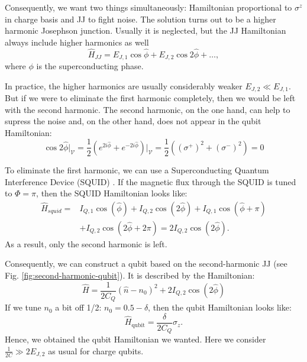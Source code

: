 \documentclass[reprint, aps, prx, amsmath, amssymb, longbibliography, superscriptaddress]{revtex4-2}
\begin{document}
Consequently, we want two things simultaneously: Hamiltonian proportional to $\sigma^z$ in charge basis and JJ to fight noise. The solution turns out to be a higher harmonic Josephson junction. Usually it is neglected, but the JJ Hamiltonian always include higher harmonics as well
\begin{equation}
    \hat H_{JJ} = E_{J,1} \cos{\hat \phi} + E_{J,2} \cos{2\hat \phi} + \dots,
\end{equation}
where $\phi$ is the superconducting phase.

In practice, the higher harmonics are usually considerably weaker $E_{J,2} \ll E_{J,1}$. But if we were to eliminate the first harmonic completely, then we would be left with the second harmonic. The second harmonic, on the one hand, can help to supress the noise and, on the other hand, does not appear in the qubit Hamiltonian:
\begin{equation}
    \cos{2\hat \phi}\bigg|_{\mathcal{V}} = \frac{1}{2}\left(e^{2i\hat\phi} + e^{-2i\hat \phi}\right)\bigg|_{\mathcal{V}}=\frac{1}{2}\left((\sigma^+)^2 + (\sigma^-)^2\right) =0
\end{equation}

To eliminate the first harmonic, we can use a Superconducting Quantum Interference Device (SQUID) \cite{valentini_parityconserving_2024}. If the magnetic flux through the SQUID is tuned to $\Phi = \pi$, then the SQUID Hamiltonian looks like:
\begin{equation}
\begin{aligned}
    \hat H_{squid} = &I_{Q,1} \cos(\hat \phi) + I_{Q,2} \cos(2\hat \phi) + I_{Q,1} \cos(\hat \phi + \pi) \\
    &+ I_{Q,2} \cos(2\hat \phi + 2\pi) = 2 I_{Q,2} \cos(2\hat \phi).
\end{aligned}
\end{equation}
As a result, only the second harmonic is left.

Consequently, we can construct a qubit based on the second-harmonic JJ (see Fig. \ref{fig:second-harmonic-qubit}). It is described by the Hamiltonian:
\begin{equation}
\label{second-harmonic-qubit}
    \hat H = \frac{1}{2C_Q} (\hat n - n_0)^2 + 2 I_{Q,2} \cos(2\hat\phi)
\end{equation}
If we tune $n_0$ a bit off 1/2: $n_0 = 0.5 - \delta$, then the qubit Hamiltonian looks like:
\begin{equation}
    \hat H_{\text{qubit}} = \frac{\delta}{2 C_Q} \sigma_z.
\end{equation}
Hence, we obtained the qubit Hamiltonian we wanted. Here we consider $\frac{1}{2C} \gg 2 E_{J,2}$ as usual for charge qubits.
\end{document}
